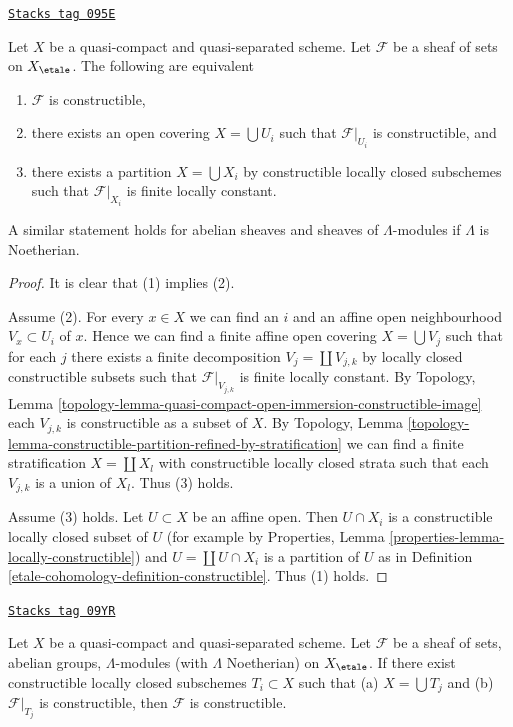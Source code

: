 \begin{lemma}
\label{etale-cohomology-lemma-constructible-quasi-compact-quasi-separated}
\href{https://stacks.math.columbia.edu/tag/095E}{\texttt{Stacks tag 095E}}

Let $X$ be a quasi-compact and quasi-separated scheme. Let $\mathcal{F}$
be a sheaf of sets on $X_\etale$. The following are equivalent
\begin{enumerate}
\item $\mathcal{F}$ is constructible,
\item there exists an open covering $X = \bigcup U_i$ such that
$\mathcal{F}|_{U_i}$ is constructible, and
\item there exists a partition $X = \bigcup X_i$ by constructible
locally closed subschemes such that $\mathcal{F}|_{X_i}$ is finite
locally constant.
\end{enumerate}
A similar statement holds for abelian sheaves and sheaves of
$\Lambda$-modules if $\Lambda$ is Noetherian.
\end{lemma}

\begin{proof}
It is clear that (1) implies (2).

\medskip\noindent
Assume (2). For every $x \in X$ we can find an $i$ and an affine open
neighbourhood $V_x \subset U_i$ of $x$. Hence we can find a finite
affine open covering $X = \bigcup V_j$ such that for each $j$ there
exists a finite decomposition $V_j = \coprod V_{j, k}$ by locally closed
constructible subsets such that $\mathcal{F}|_{V_{j, k}}$ is finite
locally constant. By Topology, Lemma
\ref{topology-lemma-quasi-compact-open-immersion-constructible-image}
each $V_{j, k}$ is constructible as a subset of $X$.
By Topology, Lemma
\ref{topology-lemma-constructible-partition-refined-by-stratification}
we can find a finite stratification $X = \coprod X_l$ with constructible
locally closed strata such that each
$V_{j, k}$ is a union of $X_l$. Thus (3) holds.

\medskip\noindent
Assume (3) holds. Let $U \subset X$ be an affine open.
Then $U \cap X_i$ is a constructible locally closed subset of $U$
(for example by Properties, Lemma \ref{properties-lemma-locally-constructible})
and $U = \coprod U \cap X_i$ is a partition of $U$ as in
Definition \ref{etale-cohomology-definition-constructible}. Thus (1) holds.
\end{proof}

\begin{lemma}
\label{etale-cohomology-lemma-constructible-constructible}
\href{https://stacks.math.columbia.edu/tag/09YR}{\texttt{Stacks tag 09YR}}

Let $X$ be a quasi-compact and quasi-separated scheme.
Let $\mathcal{F}$ be a sheaf of sets, abelian groups,
$\Lambda$-modules (with $\Lambda$ Noetherian) on $X_\etale$.
If there exist constructible locally closed subschemes $T_i \subset X$
such that (a) $X = \bigcup T_j$ and (b) $\mathcal{F}|_{T_j}$ is
constructible, then $\mathcal{F}$ is constructible.
\end{lemma}

